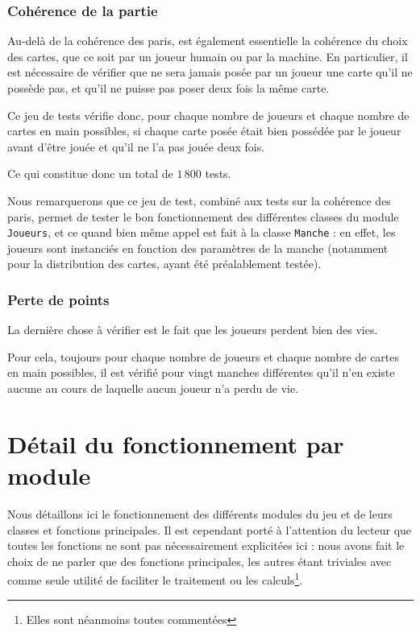       \subsubsection{Cohérence de la partie}
         Au-delà de la cohérence des paris, est également essentielle la cohérence du choix des cartes, que ce soit par un joueur humain ou par la machine.
         En particulier, il est nécessaire de vérifier que ne sera jamais posée par un joueur une carte qu'il ne possède pas, et qu'il ne puisse pas poser deux fois la même carte.

         Ce jeu de tests vérifie donc, pour chaque nombre de joueurs et chaque nombre de cartes en main possibles, si chaque carte posée était bien possédée par le joueur avant d'être jouée et qu'il ne l'a pas jouée deux fois.

         Ce qui constitue donc un total de $1\,800$ tests.

         Nous remarquerons que ce jeu de test, combiné aux tests sur la cohérence des paris, permet de tester le bon fonctionnement des différentes classes du module \texttt{Joueurs}, et ce quand bien même appel est fait à la classe \texttt{Manche} : en effet, les joueurs sont instanciés en fonction des paramètres de la manche (notamment pour la distribution des cartes, ayant été préalablement testée).

      \subsubsection{Perte de points}
         La dernière chose à vérifier est le fait que les joueurs perdent bien des vies.

         Pour cela, toujours pour chaque nombre de joueurs et chaque nombre de cartes en main possibles, il est vérifié pour vingt manches différentes qu'il n'en existe aucune au cours de laquelle aucun joueur n'a perdu de vie.

\section{Détail du fonctionnement par module}\label{sec:détail-du-fonctionnement-par-module}
   Nous détaillons ici le fonctionnement des différents modules du jeu et de leurs classes et fonctions principales.
   Il est cependant porté à l'attention du lecteur que toutes les fonctions ne sont pas nécessairement explicitées ici : nous avons fait le choix de ne parler que des fonctions principales, les autres étant triviales avec comme seule utilité de faciliter le traitement ou les calculs\footnote{Elles sont néanmoins toutes commentées}.
